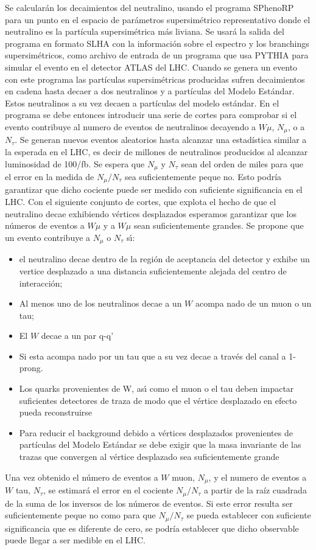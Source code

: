 \begin{ideas}
Se calcularán los decaimientos del neutralino, usando el programa
SPhenoRP para un punto en el espacio de parámetros supersimétrico
representativo %
donde el neutralino es
la partícula supersimétrica más liviana. Se usará la salida del
programa en formato SLHA %
con la información
sobre el espectro y los branchings supersimétricos, como archivo de
entrada de un programa que usa PYTHIA %
para
simular el evento en el detector ATLAS del LHC. Cuando se genera un
evento con este programa las partículas supersimétricas
producidas sufren decaimientos en cadena hasta decaer a dos
neutralinos y a partículas del Modelo Estándar. Estos neutralinos
a su vez decaen a partículas del modelo estándar.  En el programa
se debe entonces introducir una serie de cortes para comprobar si el
evento contribuye al numero de eventos de neutralinos decayendo a
$W\mu$, $N_\mu$, o a $N_\tau$. Se generan nuevos eventos aleatorios hasta
alcanzar una estadística similar a la esperada en el LHC, es
decir de millones de neutralinos producidos al alcanzar luminosidad de
100/fb.  Se espera que $N_\mu$ y $N_\tau$ sean del orden de miles para que
el error en la medida de $N_\mu/N_\tau$ sea suficientemente peque no. Esto
podría garantizar que dicho cociente puede ser medido con
suficiente significancia en el LHC. Con el siguiente conjunto de
cortes, que explota el hecho de que el neutralino decae exhibiendo
vértices desplazados %
 esperamos garantizar que
los números de eventos a $W\mu$ y a $W\mu$ sean suficientemente grandes.
Se propone que un evento contribuye a $N_\mu$ o $N_\tau$ s\'\i:
\begin{itemize}
\item el neutralino decae dentro de la región de aceptancia del
  detector y exhibe un vertice desplazado a una distancia
  suficientemente alejada del centro de interacción;
\item Al menos uno de los neutralinos decae a un $W$ acompa nado de un
  muon o un tau;
\item El $W$ decae a un par q-q'
\item Si esta acompa nado por un tau que a su vez decae a través del
  canal a 1-prong.
\item Los quarks provenientes de W, as\'\i{} como el muon o el tau deben
  impactar suficientes detectores de traza de modo que el vértice
  desplazado en efecto pueda reconstruirse
\item Para reducir el background debido a vértices desplazados
  provenientes de partículas del Modelo Estándar se debe exigir que la
  masa invariante de las trazas que convergen al vértice desplazado
  sea suficientemente grande
\end{itemize}
Una vez obtenido el número de eventos a $W$ muon, $N_\mu$, y el numero
de eventos a $W$ tau, $N_\tau$, se estimará el error en el cociente
$N_\mu/N_\tau$ a partir de la raíz cuadrada de la suma de los inversos de
los números de eventos. Si este error resulta ser suficientemente
peque no como para que $N_\mu/N_\tau$ se pueda establecer con suficiente
significancia que es diferente de cero, se podría establecer que dicho
observable puede llegar a ser medible en el LHC.


\end{ideas}
